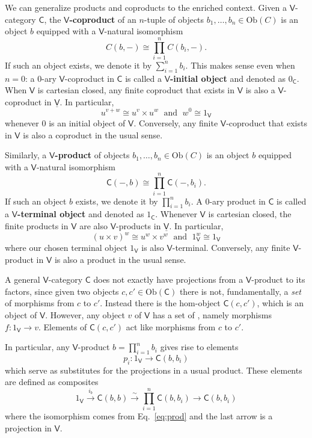 \documentclass{amsart}
\newcommand{\define}[1]{{\bf \boldmath{#1}}}
\theoremstyle{definition}
\newcommand{\V}{\mathsf{V}}
\newcommand{\C}{\mathsf{C}}
\newcommand{\Obj}{\mathrm{Ob}}
\newcommand{\maps}{\colon}
\begin{document}
%

We can generalize products and coproducts to the enriched context.
Given a $\V$-category $\C$, the \textbf{$\V$-coproduct} of an $n$-tuple of objects $b_1, \dots, b_n \in \Obj(C)$ is an object $b$ equipped with a $\V$-natural isomorphism
\[           C(b,-) \cong \prod_{i = 1}^n C(b_i,-). \]
If such an object exists, we denote it by $\sum_{i=1}^n b_i$.  
This makes sense even when $n = 0$: a 0-ary $\V$-coproduct in $\C$ is called a \textbf{$\V$-initial object} and denoted as $0_\C$.   When $\V$ is cartesian
closed, any finite coproduct that exists in $\V$ is also a $\V$-coproduct in $\underline{\V}$.   In particular,
\[          u^{v+w} \cong u^v \times u^w \; \textrm{ and } \;  w^0 \cong 1_\V \]
whenever $0$ is an initial object of $\V$.  Conversely, any finite $\V$-coproduct that
exists in $\V$ is also a coproduct in the usual sense.

Similarly, a \textbf{$\V$-product} of objects $b_1, \dots , b_n \in \Obj(C)$ is an object $b$ equipped with a $\V$-natural isomorphism
\begin{equation}
\label{eq:prod}          \C(-,b) \cong \prod_{i=1}^n \C(-,b_i). 
\end{equation}
If such an object $b$ exists, we denote it by $\prod_{i=1}^n b_i$.   A 0-ary product in $\C$ is called a \textbf{$\V$-terminal object} and denoted as $1_\C$.     Whenever $\V$ is cartesian closed, the finite products in $\V$ are also $\V$-products in $\underline{\V}$.  In particular,
\[           (u \times v)^w \cong u^w \times v^w \; \textrm{ and } \; 1_\V^w \cong 1_\V \]
where our chosen terminal object $1_\V$ is also $\V$-terminal.
Conversely, any finite $\V$-product in $\V$ is also a product in the usual sense. 

A general $\V$-category $\C$ does not exactly have projections from a 
$\V$-product to its factors, since given two objects $c, c' \in \Obj(\C)$ there is not, fundamentally, a \emph{set} of morphisms from $c$ to $c'$.  Instead there is the hom-object $\C(c,c')$, which is an object of $\V$.    However, any object $v$ of $\V$ has a set of \define{elements}, namely morphisms $f \maps 1_\V \to v$.   Elements of $\C(c,c')$ act like morphisms from $c$ to $c'$.  

In particular, any $\V$-product $b = \prod_{i=1}^n b_i$ gives rise to elements
\[    p_i \maps 1_\V \to \C(b,b_i)  \]
which serve as substitutes for the projections in a usual product.   These elements
are defined as composites
\[    1_\V \stackrel{i_b}{\longrightarrow} \C(b,b) \stackrel{\sim}{\longrightarrow} \prod_{i=1}^n \C(b,b_i) \to \C(b,b_i)   \]
where the isomorphism comes from Eq.\ \eqref{eq:prod} and the last arrow is a projection in $\V$.
\end{document}
